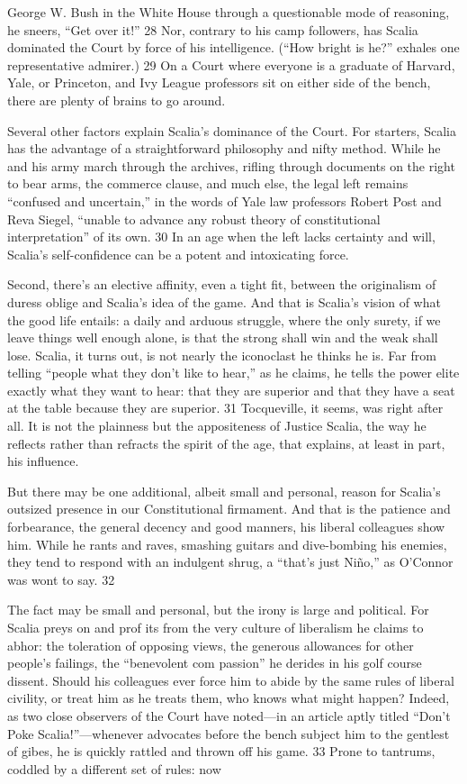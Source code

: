 George W. Bush in the White House through a questionable mode of reasoning, he sneers, “Get over it!” {\color{blue} 28 } Nor, contrary to his camp followers, has Scalia dominated the Court by force of his intelligence. (“How bright is he?” exhales one representative admirer.) {\color{blue} 29 } On a Court where everyone is a graduate of Harvard, Yale, or Princeton, and Ivy League professors sit on either side of the bench, there are plenty of brains to go around.{\par} Several other factors explain Scalia’s dominance of the Court. For starters, Scalia has the advantage of a straightforward philosophy and nifty method. While he and his army march through the archives, rifling through documents on the right to bear arms, the commerce clause, and much else, the legal left remains “confused and uncertain,” in the words of Yale law professors Robert Post and Reva Siegel, “unable to advance any robust theory of constitutional interpretation” of its own. {\color{blue} 30 } In an age when the left lacks certainty and will, Scalia’s self-confidence can be a potent and intoxicating force.{\par} Second, there’s an elective affinity, even a tight fit, between the originalism of duress oblige and Scalia’s idea of the game. And that is Scalia’s vision of what the good life entails: a daily and arduous struggle, where the only surety, if we leave things well enough alone, is that the strong shall win and the weak shall lose. Scalia, it turns out, is not nearly the iconoclast he thinks he is. Far from telling “people what they don’t like to hear,” as he claims, he tells the power elite exactly what they want to hear: that they are superior and that they have a seat at the table because they are superior. {\color{blue} 31 } Tocqueville, it seems, was right after all. It is not the plainness but the appositeness of Justice Scalia, the way he reflects rather than refracts the spirit of the age, that explains, at least in part, his influence.{\par} But there may be one additional, albeit small and personal, reason for Scalia’s outsized presence in our Constitutional firmament. And that is the patience and forbearance, the general decency and good manners, his liberal colleagues show him. While he rants and raves, smashing guitars and dive-bombing his enemies, they tend to respond with an indulgent shrug, a “that’s just Niño,” as O’Connor was wont to say. {\color{blue} 32 } {\par} The fact may be small and personal, but the irony is large and political. For Scalia preys on and prof its from the very culture of liberalism he claims to abhor: the toleration of opposing views, the generous allowances for other people’s failings, the “benevolent com passion” he derides in his golf course dissent. Should his colleagues ever force him to abide by the same rules of liberal civility, or treat him as he treats them, who knows what might happen? Indeed, as two close observers of the Court have noted—in an article aptly titled “Don’t Poke Scalia!”—whenever advocates before the bench subject him to the gentlest of gibes, he is quickly rattled and thrown off his game. {\color{blue} 33 } Prone to tantrums, coddled by a different set of rules: now 
